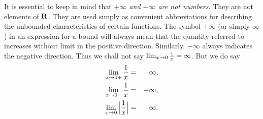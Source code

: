 It is essential to keep in mind that 
\emph{$+\infty$ and $-\infty$ are not numbers}.
They are not elements of $\mathrm{\bf R}$.
They are used simply as convenient abbreviations
for describing the unbounded characteristics of certain functions.
The symbol  $+\infty$ (or simply  $\infty$)
in an expression for a bound
will always mean that the quantity referred to increases without limit
in the positive direction.
Similarly,  $-\infty$ always indicates the negative direction.
Thus we shall not say
$\lim_{x \rightarrow 0}\frac{1}{x} = \infty$.
But we do say
\begin{eqnarray*}
\lim_{x \rightarrow 0+} \frac{1}{x}  &=& \infty,  \\
\lim_{x \rightarrow 0-} \frac{1}{x}  &=& -\infty, \\
\lim_{x \rightarrow 0} \Big|\frac{1}{x} \Big| &=& \infty. 
\end{eqnarray*}

